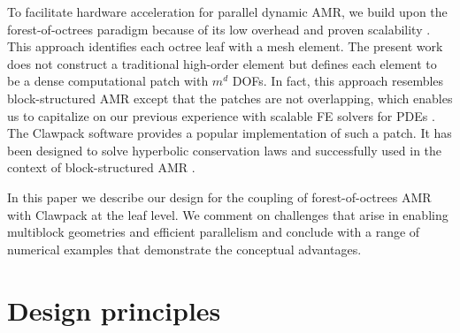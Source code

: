 \documentclass{IOS-Book-Article}     %
\newcommand{\comment}[1]{\textcolor{green}{[DAC: #1]}\xspace}
\newcommand{\clawpack}{{\sc Clawpack}\xspace}
\begin{document}
To facilitate hardware acceleration for parallel dynamic AMR, we
build upon the forest-of-octrees paradigm because of its low overhead
and proven scalability \cite{BursteddeWilcoxGhattas11}.  This approach
identifies each octree leaf with a mesh element.  The present work does not
construct a traditional high-order element but defines each element to be a
dense computational patch with $m^d$ DOFs.  In fact, this approach
resembles block-structured AMR \cite{be-ol:1984, be-co:1989,
ColellaGravesKeenEtAl07,
BerzinsLuitjensMengEtAl10} except that the
patches are not overlapping,
which enables us to capitalize on our
previous experience with scalable FE solvers for PDEs
\cite{BursteddeStadlerAlisicEtAl13}.  The \clawpack software
\cite{LeVeque97} provides a popular implementation of such a patch.
It has been designed to solve hyperbolic conservation laws
and successfully used in the context of block-structured AMR
\cite{be-le:1991, amrclaw, Berger:2011du}.

In this paper we describe our design for the coupling of forest-of-octrees AMR
with \clawpack at the leaf level.  We comment on challenges that arise in
enabling multiblock geometries and efficient parallelism and conclude with a range
of numerical examples that demonstrate the conceptual advantages.

\section{Design principles}
\end{document}
